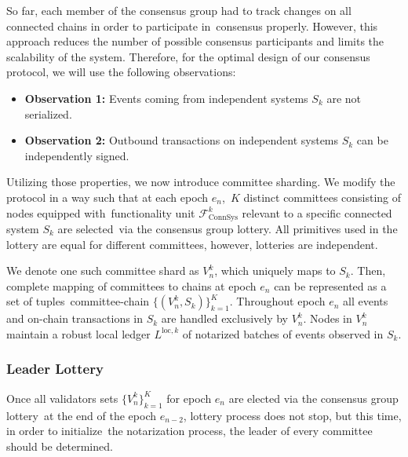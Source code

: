 So far, each member of the consensus group had to track changes on all connected chains in order to participate in\
consensus properly.
However, this approach reduces the number of possible consensus participants and limits the scalability of the system.
Therefore, for the optimal design of our consensus protocol, we will use the following observations:
\begin{itemize}
    \item[]\textbf{Observation 1:} Events coming from independent systems $S_k$ are not serialized.
    \item[]\textbf{Observation 2:} Outbound transactions on independent systems $S_k$ can be independently signed.
\end{itemize}

Utilizing those properties, we now introduce committee sharding.
We modify the protocol in a way such that at each epoch $e_n$,\
$K$ distinct committees consisting of nodes equipped with\
functionality unit $\mathcal{F}^k_{\text{ConnSys}}$ relevant to a specific connected system $S_k$ are selected\
via the consensus group lottery.
All primitives used in the lottery are equal for different committees, however, lotteries are independent.

We denote one such committee shard as $V_n^k$, which uniquely maps to $S_k$.
Then, complete mapping of committees to chains at epoch $e_n$ can be represented as a set of tuples\
committee-chain $\{(V_n^k, S_k)\}_{k=1}^K$.
Throughout epoch $e_n$ all events and on-chain transactions in $S_k$ are handled exclusively by $V_n^k$.
Nodes in $V_n^k$ maintain a robust local ledger $L^{\text{loc}, k}$ of notarized batches of events observed in $S_k$.

\subsubsection{Leader Lottery}\label{subsubsec:leader-lottery}
Once all validators sets $\{V_n^k\}_{k=1}^K$ for epoch $e_n$ are elected via the consensus group lottery\
at the end of the epoch $e_{n-2}$, lottery process does not stop, but this time, in order to initialize\
the notarization process, the leader of every committee should be determined.

